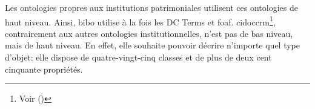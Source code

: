 Les ontologies propres aux institutions patrimoniales utilisent ces ontologies de haut niveau. Ainsi, \ac{bibo} utilise à la fois les DC Terms et \ac{foaf}. \ac{cidoccrm}\footnote{Voir  ()}, contrairement aux autres ontologies institutionnelles, n'est pas de bas niveau, mais de haut niveau. En effet, elle souhaite pouvoir décrire n'importe quel type d'objet: elle dispose de quatre-vingt-cinq classes et de plus de deux cent cinquante propriétés.